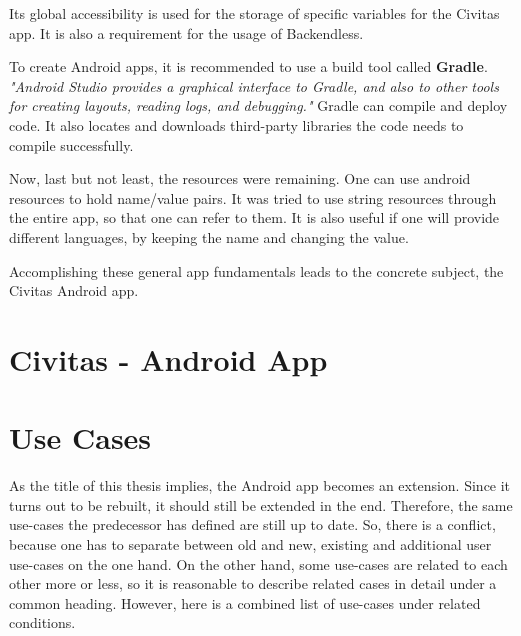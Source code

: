 Its global accessibility is used for the storage of specific variables for the Civitas app.
It is also a requirement for the usage of Backendless.

To create Android apps, it is recommended to use a build tool called \textbf{Gradle}. \textit{"Android Studio provides a graphical interface to Gradle, and also to other tools for creating layouts, reading logs, and debugging."} \citep[p. 7]{Griffiths:2017} Gradle can compile and deploy code. It also locates and downloads third-party libraries the code needs to compile successfully. 

Now, last but not least, the resources were remaining. One can use android resources to hold name/value pairs. It was tried to use string resources through the entire app, so that one can refer to them. It is also useful if one will provide different languages, by keeping the name and changing the value.

Accomplishing these general app fundamentals leads to the concrete subject, the Civitas Android app.
 
\section{Civitas - Android App}

\section{Use Cases}
\label{design:subsection:use_cases}
As the title of this thesis implies, the Android app becomes an extension. Since it turns out to be rebuilt, it should still be extended in the end. Therefore, the same use-cases the predecessor has defined are still up to date. \citep[cf. p. 24]{Ganapijev18}
So, there is a conflict, because one has to separate between old and new, existing and additional user use-cases on the one hand. On the other hand, some use-cases are related to each other more or less, so it is reasonable to describe related cases in detail under a common heading. However, here is a combined list of use-cases under related conditions.

